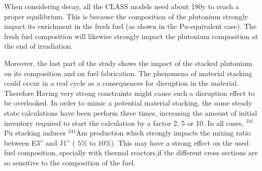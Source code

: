 \documentclass[12pt]{article}
\begin{document}
When considering decay, all the CLASS models need about 180y to reach a proper
equilibrium. This is because the composition of the plutonium strongly impact
its enrichment in the fresh fuel (as shown in the Pu-equivalent case). The fresh
fuel composition will likewise strongly impact the plutonium composition at the
end of irradiation. 

Moreover, the last part of the study shows the impact of the stacked plutonium
on its composition and on fuel fabrication. The phenomena of material stacking
could occur in a real cycle as a consequences for disruption in the material.
Therefore Having very strong constraints might cause such a disruption effect to
be overlooked.  In order to mimic a potential material stacking, the same steady
state calculations have been perform three times, increasing the amount of
initial inventory required to start the calculation by a factor 2, 5 or 10. In
all cases, $^{241}$Pu stacking induces $^{241}$Am production which strongly
impacts the mixing ratio between E3'' and J1'' ( $5\%$ to $10\%$). This may have
a strong effect on the used fuel composition, specially with thermal reactors,if
the different cross sections are so sensitive to the composition of the fuel.








\end{document}
